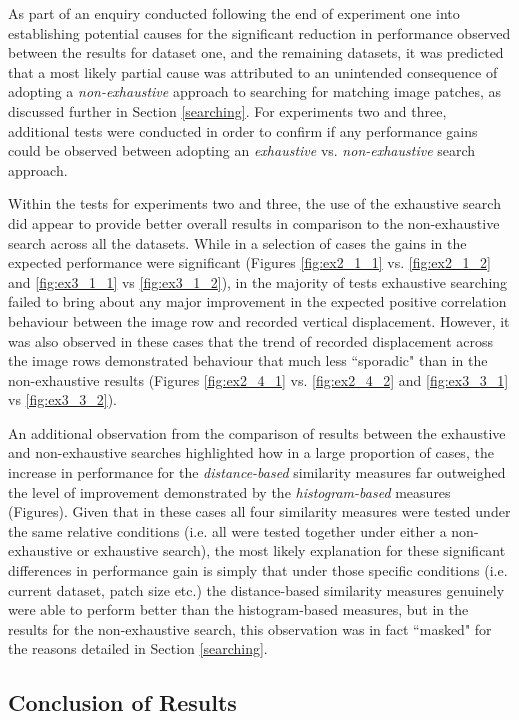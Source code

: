 As part of an enquiry conducted following the end of experiment one into establishing potential causes for the significant reduction in performance observed between the results for dataset one, and the remaining datasets, it was predicted that a most likely partial cause was attributed to an unintended consequence of adopting a \textit{non-exhaustive} approach to searching for matching image patches, as discussed further in Section \ref{searching}. For experiments two and three, additional tests were conducted in order to confirm if any performance gains could be observed between adopting an \textit{exhaustive} vs. \textit{non-exhaustive} search approach. 

Within the tests for experiments two and three, the use of the exhaustive search did appear to provide better overall results in comparison to the non-exhaustive search across all the datasets. While in a selection of cases the gains in the expected performance were significant (Figures \ref{fig:ex2_1_1} vs. \ref{fig:ex2_1_2} and  \ref{fig:ex3_1_1} vs \ref{fig:ex3_1_2}), in the majority of tests exhaustive searching failed to bring about any major improvement in the expected positive correlation behaviour between the image row and recorded vertical displacement. However, it was also observed in these cases that the trend of recorded displacement across the image rows demonstrated behaviour that much less ``sporadic" than in the non-exhaustive results (Figures \ref{fig:ex2_4_1} vs. \ref{fig:ex2_4_2} and  \ref{fig:ex3_3_1} vs \ref{fig:ex3_3_2}).

An additional observation from the comparison of results between the exhaustive and non-exhaustive searches highlighted how in a large proportion of cases, the increase in performance for the \textit{distance-based} similarity measures far outweighed the level of improvement demonstrated by the \textit{histogram-based} measures (Figures). Given that in these cases all four similarity measures were tested under the same relative conditions (i.e. all were tested together under either a non-exhaustive or exhaustive search), the most likely explanation for these significant differences in performance gain is simply that under those specific conditions (i.e. current dataset, patch size etc.) the distance-based similarity measures genuinely were able to perform better than the histogram-based measures, but in the results for the non-exhaustive search, this observation was in fact ``masked" for the reasons detailed in Section \ref{searching}.

\subsection{Conclusion of Results}

